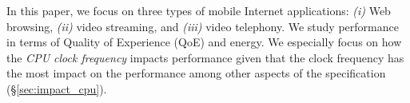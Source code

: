 In this paper, we focus on three types of mobile Internet applications:  {\em (i)} Web browsing, {\em (ii)} video streaming, and {\em (iii)} video telephony. We study performance in terms of Quality of Experience (QoE) and energy. We especially focus on how the {\em CPU clock frequency} impacts performance 
given that the clock frequency
has the most impact on the performance
among other aspects of the specification (\S\ref{sec:impact_cpu}).%

